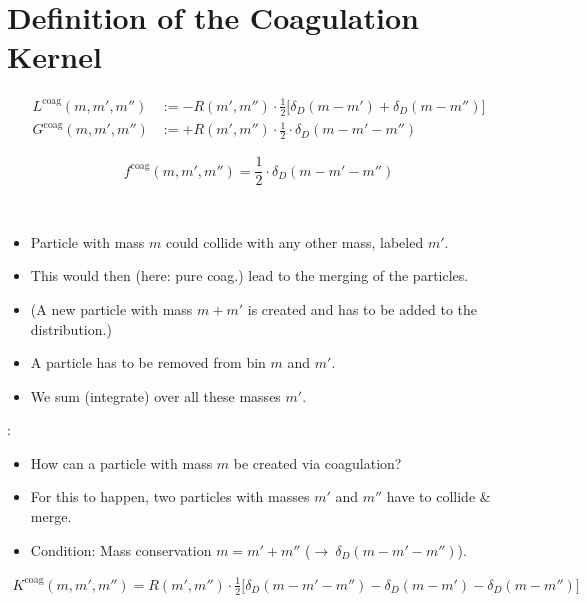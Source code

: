 \section{Definition of the Coagulation Kernel}
\label{sec:coagulation_kernel}

    \begin{align}
        L^\text{coag}(m, m', m'') 
            &:= -R(m',m'') \cdot \frac{1}{2} \bigg[\delta_D(m-m')+\delta_D(m-m'')\bigg] \\
        G^\text{coag}(m, m', m'') 
            &:= +R(m',m'') \cdot \frac{1}{2} \cdot \delta_D(m-m'-m'')
    \end{align}

    \begin{equation}
        f^\text{coag}(m,m',m'') = \frac{1}{2} \cdot \delta_D(m-m'-m'')
    \end{equation}

     \\

    \begin{itemize}
        \item Particle with mass $m$ could collide with any other mass, labeled $m'$.
        \item This would then (here: pure coag.) lead to the merging of the particles.
        \item (A new particle with mass $m+m'$ is created and has to be added to the distribution.)
        \item A particle has to be removed from bin $m$ and $m'$.
        \item We sum (integrate) over all these masses $m'$.
    \end{itemize}

    :
    \begin{itemize}
        \item How can a particle with mass $m$ be created via coagulation?
        \item For this to happen, two particles with masses $m'$ and $m''$ have to collide \& merge.
        \item Condition: Mass conservation $m=m'+m''$ ($\to\ \delta_D(m-m'-m'')$).
    \end{itemize}

    \begin{align}
        K^\text{coag}(m,m',m'') = R(m',m'') \cdot \frac{1}{2}
        \bigg[
            \delta_D(m-m'-m'') - \delta_D(m-m') - \delta_D(m-m'')
        \bigg]
    \end{align}

